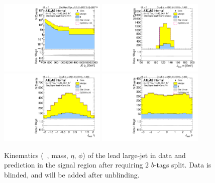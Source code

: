 \clearpage

\begin{figure}[htbp!]
\begin{center}
\includegraphics[width=0.45\textwidth,angle=-90]{figures/boosted/Signal/b77_TwoTag_split_Signal_leadHCand_Pt_m_1_blind.pdf}
\includegraphics[width=0.45\textwidth,angle=-90]{figures/boosted/Signal/b77_TwoTag_split_Signal_leadHCand_Mass_s_blind.pdf}\\
\includegraphics[width=0.45\textwidth,angle=-90]{figures/boosted/Signal/b77_TwoTag_split_Signal_leadHCand_Eta_blind.pdf}
\includegraphics[width=0.45\textwidth,angle=-90]{figures/boosted/Signal/b77_TwoTag_split_Signal_leadHCand_Phi_blind.pdf}
  \caption{Kinematics (\pt~, mass, $\eta$, $\phi$) of the lead large-\R jet in data and prediction in the signal region after requiring 2 $b$-tags split. Data is blinded, and will be added after unblinding.}
  \label{fig:boosted-2bs-signal-blind-ak10-lead}
\end{center}
\end{figure}

